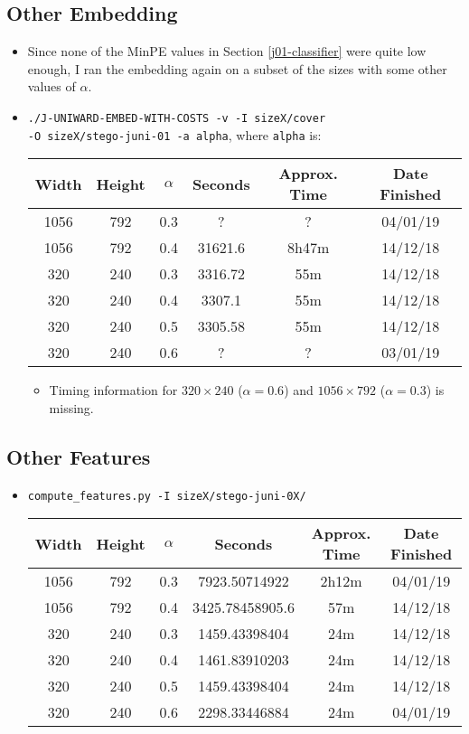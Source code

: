 \documentclass[11pt,a4paper]{report}
\begin{document}
\subsection{Other Embedding}
\begin{itemize}
\item Since none of the MinPE values in Section \ref{j01-classifier} were quite low enough, I ran the embedding again on a subset of the sizes with some other values of $\alpha$.
\item \texttt{./J-UNIWARD-EMBED-WITH-COSTS -v -I sizeX/cover} \\
         \texttt{-O sizeX/stego-juni-01 -a alpha}, where \texttt{alpha} is:
  \begin{center}
  \begin{tabular}{ c c | c | c c c }
  Width & Height & $\alpha$ & Seconds & Approx. Time & Date Finished \\ \hline
  1056 & 792 & 0.3 & ? & ? & 04/01/19 \\
  1056 & 792 & 0.4 & 31621.6 & 8h47m & 14/12/18 \\
  320 & 240 & 0.3 & 3316.72 & 55m & 14/12/18 \\
  320 & 240 & 0.4 & 3307.1 & 55m & 14/12/18 \\
  320 & 240 & 0.5 & 3305.58 & 55m & 14/12/18 \\
  320 & 240 & 0.6 & ? & ? & 03/01/19 \\
  \end{tabular}
  \end{center}
  \begin{itemize}
    \item Timing information for $320 \times 240$ ($\alpha = 0.6$) and $1056 \times 792$ ($\alpha = 0.3$) is missing.
  \end{itemize}
\end{itemize}

\subsection{Other Features}
\begin{itemize}
\item \texttt{compute\_features.py -I sizeX/stego-juni-0X/}
  \begin{center}
  \begin{tabular}{ c c | c | c c c }
  Width & Height & $\alpha$ & Seconds & Approx. Time & Date Finished \\ \hline
  1056 & 792 & 0.3 & 7923.50714922 & 2h12m & 04/01/19 \\
  1056 & 792 & 0.4 & 3425.78458905.6 & 57m & 14/12/18 \\
  320 & 240 & 0.3 & 1459.43398404 & 24m & 14/12/18 \\
  320 & 240 & 0.4 & 1461.83910203 & 24m & 14/12/18 \\
  320 & 240 & 0.5 & 1459.43398404 & 24m & 14/12/18 \\
  320 & 240 & 0.6 & 2298.33446884 & 24m & 04/01/19 \\
  \end{tabular}
  \end{center}
\end{itemize}
\end{document}
